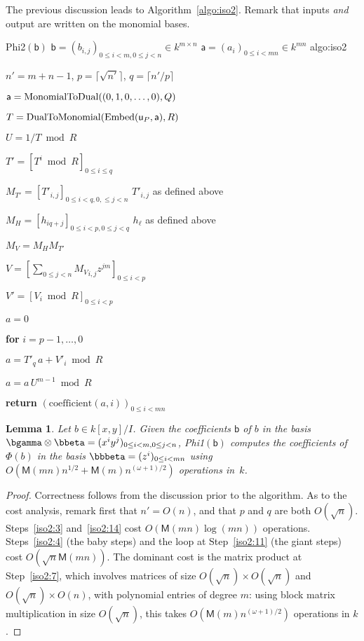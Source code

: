 \documentclass{sig-alternate}
\def\M {\ensuremath{\mathsf{M}}}
\def\va {\ensuremath{\mathsf{a}}}
\def\vy {\ensuremath{\mathsf{a}}}
\def\vu {\ensuremath{\mathsf{u}}}
\def\vb {\ensuremath{\mathsf{b}}}
\def\coeff {\ensuremath{\mathrm{coefficient}}}
\newcounter{algo}
\newenvironment{algorithm_endline}[4]{\small\begin{center}\begin{minipage}{0.48\textwidth}
      \refstepcounter{algo}
      \label{#4}
      \sf
      \rule{\textwidth}{0.2pt}\\
      \makebox[\textwidth][c]{Algorithm~\arabic{algo}:~\textbf{#1}}\\
      \rule[0.5\baselineskip]{\textwidth}{0.2pt}\\

      \vspace{-12pt}

      \parbox{\textwidth}{\textbf{Input} #2}
      \parbox{\textwidth}{\textbf{Output} #3}

\vspace{-7pt}

      \begin{enumerate*}}{\end{enumerate*}
      \vspace{-11pt}
      \rule{\textwidth}{0.2pt}
\end{minipage}\end{center}
}
\newtheorem{Lemma}{Lemma}
\begin{document}
The previous discussion leads to Algorithm~\ref{algo:iso2}. Remark
that inputs {\em and} output are written on the monomial bases.

\begin{algofloat}
  \begin{algorithm_endline}
{Phi2$(\vb)$}      
{$\vb = (b_{i,j})_{0 \le i < m, 0 \le j < n} \in k^{m \times n}$}
{$\va = (a_{i})_{0 \le i < mn} \in k^{m n}$}
{algo:iso2}
\item $n'=m+n-1$, $p=\lceil \sqrt {n'} \rceil$, $q=\lceil n'/p\rceil$
\item $\vy={\rm MonomialToDual}((0,1,0,\dots,0),Q)$ 
\item \label{iso2:2} $T={\rm DualToMonomial}({\rm Embed}(\vu_P, \vy), R)$
\item \label{iso2:3} $U=1/T \bmod R$
\item \label{iso2:4} $T'=[T^i \bmod R]_{0 \le i \le q}$
\item $M_{T'}=[T'_{i,j}]_{0\le i < q, 0, \le j < n}$ \hfill $T'_{i,j}$ as defined above
\item $M_H=[h_{iq+j}]_{0 \le i <p, 0 \le j < q}$ \hfill $h_\ell$ as defined above
\item \label{iso2:7} $M_V = M_H M_{T'}$
\item $V=[\sum_{0 \le j <n} {M_V}_{i,j} z^{jm} ]_{0 \le i <p}$
\item $V'=[V_i \bmod R]_{0 \le i <p}$
\item $a=0$
\item {\bf for} {$i=p-1,\dots,0$}\label{iso2:11}
\item \hspace{7mm} $a=T'_q\, a+V'_i \bmod R$
\item \label{iso2:14} $a=a\, U^{m-1} \bmod R$
\item {\bf return} $(\coeff(a,i))_{0 \le i < mn}$
  \end{algorithm_endline}
\vspace{-5ex}
\end{algofloat}

\begin{Lemma}
  Let $b \in k[x,y]/I$. Given the coefficients $\vb$ of $b$ in the
  basis $\bgamma \otimes \bbeta=(x^i y^j)_{0 \le i < m, 0 \le j < n}$,
  {\em Phi1}$(\vb)$ computes the coefficients of $\Phi(b)$ in the
  basis $\bbbeta=(z^i)_{0 \le i < mn}$ using $O(\M(mn)n^{1/2}+\M(m)
  n^{(\omega+1)/2} )$ operations in~$k$.
\end{Lemma}
\begin{proof}
  Correctness follows from the discussion prior to the algorithm.  As
  to the cost analysis, remark first that $n'=O(n)$, and that $p$ and
  $q$ are both $O(\sqrt{n})$. Steps~\ref{iso2:3} and~\ref{iso2:14}
  cost $O(\M(mn)\log(mn))$ operations. Steps~\ref{iso2:4} (the baby
  steps) and the loop at Step~\ref{iso2:11} (the giant steps) cost
  $O(\sqrt{n}\M(mn))$. The dominant cost is the matrix product at
  Step~\ref{iso2:7}, which involves matrices of size $O(\sqrt{n})
  \times O(\sqrt{n})$ and $O(\sqrt{n}) \times O(n)$, with polynomial
  entries of degree $m$: using block matrix multiplication in size
  $O(\sqrt{n})$, this takes $O(\M(m) n^{(\omega+1)/2})$ operations in
  $k$.
\end{proof}
\end{document}
